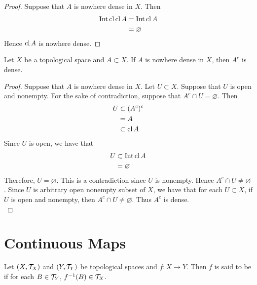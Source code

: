 \documentclass{book}
\begin{document}
	\begin{proof}
		Suppose that $A$ is nowhere dense in $X$. Then 
		\begin{align*}
			\operatorname{Int} \operatorname{cl} \operatorname{cl} A
			& = \operatorname{Int} \operatorname{cl} A \\
			& = \varnothing
		\end{align*}
		Hence $\operatorname{cl} A$ is nowhere dense.
	\end{proof}
	

	\begin{ex}  
		Let $X$ be a topological space and $A \subset X$. If $A$ is nowhere dense in $X$, then $A^c$ is dense.
	\end{ex}
	
	\begin{proof}
		Suppose that $A$ is nowhere dense in $X$. Let $U \subset X$. Suppose that $U$ is open and nonempty. For the sake of contradiction, suppose that  $A^c \cap U = \varnothing$. Then 
		\begin{align*}
			U 
			& \subset (A^c)^c \\
			& = A \\
			& \subset \operatorname{cl} A
		\end{align*}
		Since $U$ is open, we have that  
		\begin{align*}
			U 
			& \subset \operatorname{Int} \operatorname{cl} A \\
			& = \varnothing 
		\end{align*}
		Therefore, $U = \varnothing$. This is a contradiction since $U$ is nonempty. Hence $A^c \cap U \neq \varnothing$. Since $U$ is arbitrary open nonempty subset of $X$, we have that for each $U \subset X$, if $U$ is open and nonempty, then $A^c \cap U \neq \varnothing$. Thus $A^c$ is dense.  \\
	\end{proof}
	
	
	
	
	
	
	
	
	
	
	
	
	
	
	
	
	
	
	
	
	
	
	
	\newpage
	\section{Continuous Maps}	
	
	\begin{defn} 
	Let $(X,\mathcal{T}_X)$ and $(Y,\mathcal{T}_Y)$ be topological spaces and $f:X \rightarrow Y$. Then $f$ is said to be  if for each $B \in \mathcal{T}_Y$, $f^{-1}(B) \in \mathcal{T}_X$.
	\end{defn}
\end{document}
